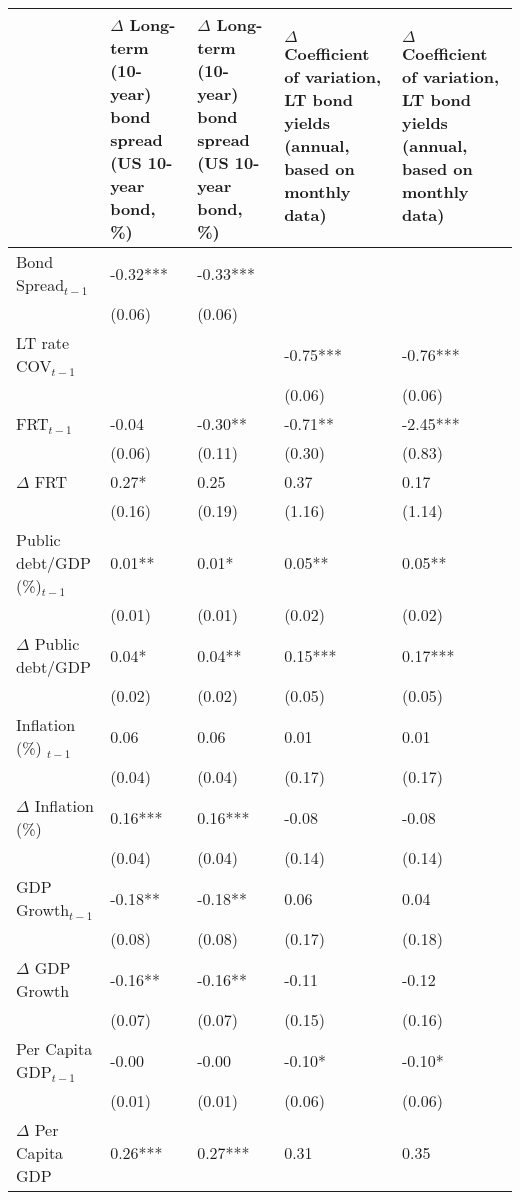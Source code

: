 \begingroup\tiny
\begin{tabular}{lp{3cm}p{3cm}p{3cm}p{3cm}}
  \hline
 & $\Delta$ Long-term (10-year) bond spread (US 10-year bond, \%) & $\Delta$ Long-term (10-year) bond spread (US 10-year bond, \%) & $\Delta$ Coefficient of variation, LT bond yields (annual, based on monthly data) & $\Delta$ Coefficient of variation, LT bond yields (annual, based on monthly data) \\ 
  \hline
Bond Spread$_{t-1}$ & -0.32*** & -0.33*** &  &  \\ 
   & (0.06) & (0.06) &  &  \\ 
  LT rate COV$_{t-1}$ &  &  & -0.75*** & -0.76*** \\ 
   &  &  & (0.06) & (0.06) \\ 
  FRT$_{t-1}$ & -0.04 & -0.30** & -0.71** & -2.45*** \\ 
   & (0.06) & (0.11) & (0.30) & (0.83) \\ 
  $\Delta$ FRT & 0.27* & 0.25 & 0.37 & 0.17 \\ 
   & (0.16) & (0.19) & (1.16) & (1.14) \\ 
  Public debt/GDP (\%)$_{t-1}$ & 0.01** & 0.01* & 0.05** & 0.05** \\ 
   & (0.01) & (0.01) & (0.02) & (0.02) \\ 
  $\Delta$ Public debt/GDP & 0.04* & 0.04** & 0.15*** & 0.17*** \\ 
   & (0.02) & (0.02) & (0.05) & (0.05) \\ 
  Inflation (\%) $_{t-1}$ & 0.06 & 0.06 & 0.01 & 0.01 \\ 
   & (0.04) & (0.04) & (0.17) & (0.17) \\ 
  $\Delta$ Inflation (\%) & 0.16*** & 0.16*** & -0.08 & -0.08 \\ 
   & (0.04) & (0.04) & (0.14) & (0.14) \\ 
  GDP Growth$_{t-1}$ & -0.18** & -0.18** & 0.06 & 0.04 \\ 
   & (0.08) & (0.08) & (0.17) & (0.18) \\ 
  $\Delta$ GDP Growth & -0.16** & -0.16** & -0.11 & -0.12 \\ 
   & (0.07) & (0.07) & (0.15) & (0.16) \\ 
  Per Capita GDP$_{t-1}$ & -0.00 & -0.00 & -0.10* & -0.10* \\ 
   & (0.01) & (0.01) & (0.06) & (0.06) \\ 
  $\Delta$ Per Capita GDP & 0.26*** & 0.27*** & 0.31 & 0.35 \\ 

\end{tabular}

